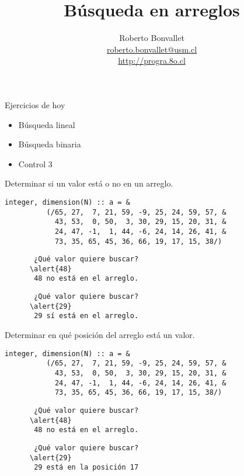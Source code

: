 \documentclass[10pt]{beamer}
\title{Búsqueda en arreglos}
\author{
  Roberto Bonvallet \\
  \url{roberto.bonvallet@usm.cl} \\
  \url{http://progra.8o.cl}
}
\begin{document}
  \begin{frame}
    \maketitle
  \end{frame}

  \begin{frame}{Ejercicios de hoy}
    \begin{itemize}
      \item Búsqueda lineal
      \item Búsqueda binaria
      \item Control 3
    \end{itemize}
  \end{frame}

  \begin{frame}[fragile]
    Determinar si un valor está o no en un arreglo.

    \begin{lstlisting}[gobble=6]
      integer, dimension(N) :: a = &
          (/65, 27,  7, 21, 59, -9, 25, 24, 59, 57, &
            43, 53,  0, 50,  3, 30, 29, 15, 20, 31, &
            24, 47, -1,  1, 44, -6, 24, 14, 26, 41, &
            73, 35, 65, 45, 36, 66, 19, 17, 15, 38/)
    \end{lstlisting}

    \begin{Verbatim}
       ¿Qué valor quiere buscar?
      \alert{48}
       48 no está en el arreglo.
    \end{Verbatim}

    \begin{Verbatim}
       ¿Qué valor quiere buscar?
      \alert{29}
       29 sí está en el arreglo.
    \end{Verbatim}

\end{frame}

  \begin{frame}[fragile]
    Determinar en qué posición del arreglo está un valor.

    \begin{lstlisting}[gobble=6]
      integer, dimension(N) :: a = &
          (/65, 27,  7, 21, 59, -9, 25, 24, 59, 57, &
            43, 53,  0, 50,  3, 30, 29, 15, 20, 31, &
            24, 47, -1,  1, 44, -6, 24, 14, 26, 41, &
            73, 35, 65, 45, 36, 66, 19, 17, 15, 38/)
    \end{lstlisting}

    \begin{Verbatim}
       ¿Qué valor quiere buscar?
      \alert{48}
       48 no está en el arreglo.
    \end{Verbatim}

    \begin{Verbatim}
       ¿Qué valor quiere buscar?
      \alert{29}
       29 está en la posición 17
    \end{Verbatim}

\end{frame}
\end{document}
